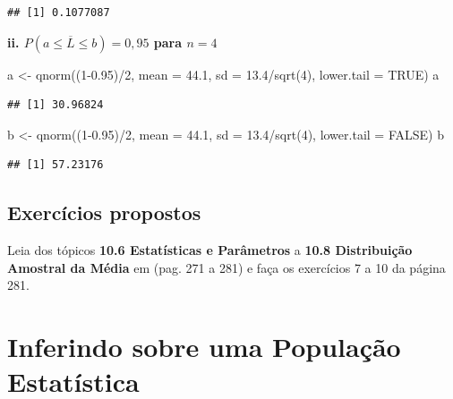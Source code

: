\documentclass[
]{book}
\newenvironment{Shaded}{\begin{snugshade}}{\end{snugshade}}
\newcommand{\AttributeTok}[1]{\textcolor[rgb]{0.77,0.63,0.00}{#1}}
\newcommand{\ConstantTok}[1]{\textcolor[rgb]{0.00,0.00,0.00}{#1}}
\newcommand{\DecValTok}[1]{\textcolor[rgb]{0.00,0.00,0.81}{#1}}
\newcommand{\FloatTok}[1]{\textcolor[rgb]{0.00,0.00,0.81}{#1}}
\newcommand{\FunctionTok}[1]{\textcolor[rgb]{0.00,0.00,0.00}{#1}}
\newcommand{\NormalTok}[1]{#1}
\newcommand{\OtherTok}[1]{\textcolor[rgb]{0.56,0.35,0.01}{#1}}
\newcommand{\SpecialCharTok}[1]{\textcolor[rgb]{0.00,0.00,0.00}{#1}}
\begin{document}
\begin{verbatim}
## [1] 0.1077087
\end{verbatim}

\textbf{ii. \(P(a \le \overline{L} \le b) = 0,95\) para \(n = 4\)}

\begin{Shaded}
\begin{Highlighting}[]
\NormalTok{a }\OtherTok{\textless{}{-}} \FunctionTok{qnorm}\NormalTok{((}\DecValTok{1}\FloatTok{{-}0.95}\NormalTok{)}\SpecialCharTok{/}\DecValTok{2}\NormalTok{, }
      \AttributeTok{mean =} \FloatTok{44.1}\NormalTok{, }
      \AttributeTok{sd =} \FloatTok{13.4}\SpecialCharTok{/}\FunctionTok{sqrt}\NormalTok{(}\DecValTok{4}\NormalTok{), }
      \AttributeTok{lower.tail =} \ConstantTok{TRUE}\NormalTok{)}
\NormalTok{a}
\end{Highlighting}
\end{Shaded}

\begin{verbatim}
## [1] 30.96824
\end{verbatim}

\begin{Shaded}
\begin{Highlighting}[]
\NormalTok{b }\OtherTok{\textless{}{-}} \FunctionTok{qnorm}\NormalTok{((}\DecValTok{1}\FloatTok{{-}0.95}\NormalTok{)}\SpecialCharTok{/}\DecValTok{2}\NormalTok{, }
      \AttributeTok{mean =} \FloatTok{44.1}\NormalTok{, }
      \AttributeTok{sd =} \FloatTok{13.4}\SpecialCharTok{/}\FunctionTok{sqrt}\NormalTok{(}\DecValTok{4}\NormalTok{), }
      \AttributeTok{lower.tail =} \ConstantTok{FALSE}\NormalTok{)}
\NormalTok{b}
\end{Highlighting}
\end{Shaded}

\begin{verbatim}
## [1] 57.23176
\end{verbatim}

\hypertarget{exercuxedcios-propostos-1}{%
\section{Exercícios propostos}\label{exercuxedcios-propostos-1}}

Leia dos tópicos \textbf{10.6 Estatísticas e Parâmetros} a \textbf{10.8 Distribuição Amostral da Média} em \citep{bussabemoretin6a} (pag. 271 a 281) e faça os exercícios 7 a 10 da página 281.

\hypertarget{inferenc}{%
\chapter{Inferindo sobre uma População Estatística}\label{inferenc}}
\end{document}
